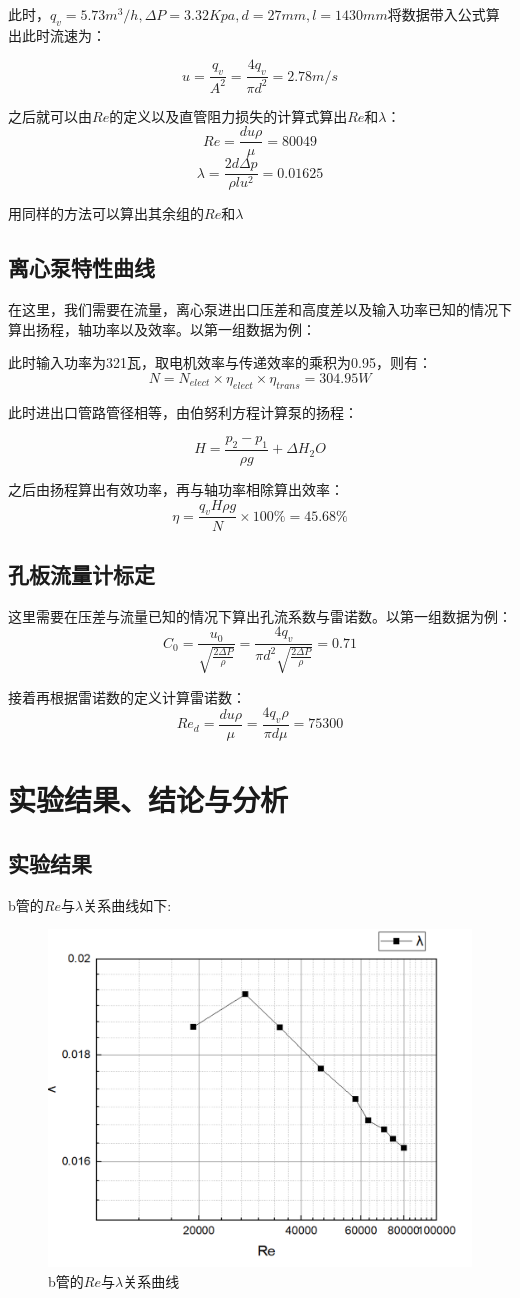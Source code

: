 \documentclass[a4paper,UTF8]{ctexrep}
\theoremstyle{plain}
\theoremstyle{definition}
\numberwithin{equation}{chapter}
\begin{document}
        此时，$q_v=5.73m^3/h, \Delta P = 3.32Kpa, d=27mm, l=1430mm$将数据带入公式算出此时流速为：

        $$ u =\frac{q_v}{A^2}=\frac{4q_v}{\pi d^2}=2.78m/s$$

        之后就可以由$Re$的定义以及直管阻力损失的计算式算出$Re$和$\lambda$：
        $$Re= \frac{du\rho}{\mu}=80049 $$
        $$\lambda = \frac{2d\Delta p}{\rho l u^2  }=0.01625$$  

        用同样的方法可以算出其余组的$Re$和$\lambda$
        
        \subsection{离心泵特性曲线}
        在这里，我们需要在流量，离心泵进出口压差和高度差以及输入功率已知的情况下算出扬程，轴功率以及效率。以第一组数据为例：

        此时输入功率为321瓦，取电机效率与传递效率的乘积为0.95，则有：
        $$N=N_{elect} \times \eta_{elect} \times \eta_{trans} = 304.95W $$

        此时进出口管路管径相等，由伯努利方程计算泵的扬程：

        $$H=\frac{p_2-p_1}{\rho g}+\Delta H_2O$$

        之后由扬程算出有效功率，再与轴功率相除算出效率：
        $$\eta = \frac{q_v H \rho g}{N}\times 100\%= 45.68\%$$
        
        
        \subsection{孔板流量计标定}
        这里需要在压差与流量已知的情况下算出孔流系数与雷诺数。以第一组数据为例：
        $$C_0=\frac{u _0}{\sqrt{\frac{2\Delta P}{\rho}}}=\frac{4q_v}{\pi d^2 \sqrt{\frac{2\Delta P}{\rho}}}=0.71$$

        接着再根据雷诺数的定义计算雷诺数：
        $$Re_d= \frac{du\rho}{\mu}= \frac{4q_v\rho}{\pi d\mu}=75300$$
        \newpage
        \section{实验结果、结论与分析}
\subsection{实验结果}
b管的$Re$与$\lambda$关系曲线如下:
\begin{figure}[h]
    \centering
    \includegraphics[width=0.6\linewidth]{image.png}
    \caption{b管的$Re$与$\lambda$关系曲线}
    \label{fig:enter-label}
\end{figure}
\end{document}
